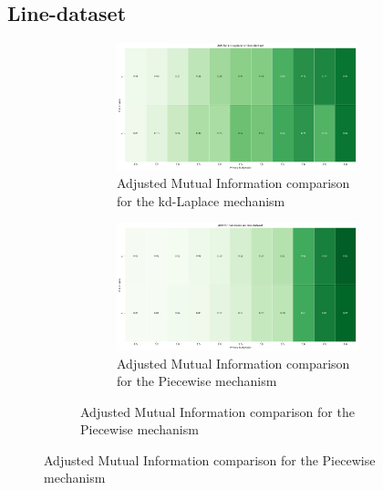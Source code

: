 \subsection{Line-dataset}
\begin{figure}[H]
    \centering
    \begin{subfigure}[b]{0.85\textwidth}
        \begin{subfigure}[c]{1\textwidth}
            \includegraphics[width=1\textwidth]{Results/kd-laplace/kd-Laplace/line-dataset/ami.png}
            \caption{Adjusted Mutual Information comparison for the kd-Laplace mechanism}
            \label{fig:ami_line-dataset_comparison_kdlaplace_2d}
        \end{subfigure}
        \vfill %
        \begin{subfigure}[c]{1\textwidth}
            \includegraphics[width=1\textwidth]{Results/kd-laplace/piecewise/line-dataset/ami.png}
            \caption{Adjusted Mutual Information comparison for the Piecewise mechanism}
            \label{fig:ami_line-dataset_comparison_piecewise_2d}
        \end{subfigure}
    \end{subfigure}
    \hfill %

\end{figure}
